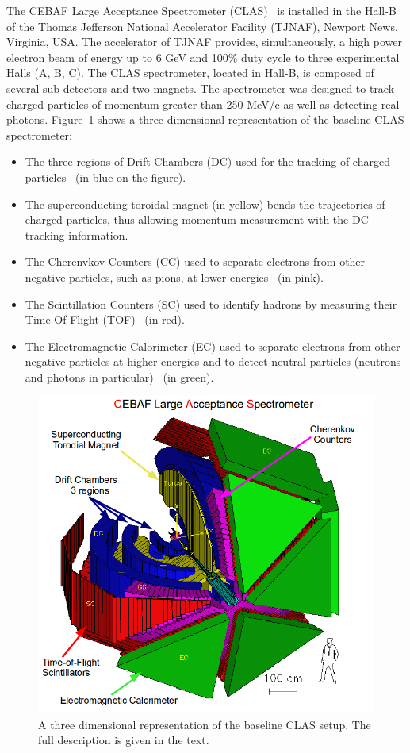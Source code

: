 \documentclass[twocolumn,showpacs,superscriptaddress,groupedaddress]{revtex4}
\begin{document}
The CEBAF Large Acceptance Spectrometer (CLAS)~\cite{CLASref} is installed in 
the Hall-B of the Thomas Jefferson National Accelerator Facility (TJNAF), 
Newport News, Virginia, USA. The accelerator of TJNAF provides, simultaneously, 
a high power electron beam of energy up to 6 GeV and 100$\%$ duty cycle to 
three experimental Halls (A, B, C). The CLAS spectrometer, located in Hall-B, 
is composed of several sub-detectors and two magnets. The spectrometer was 
designed to track charged particles of momentum greater than 250 MeV/c as well 
as detecting real photons. Figure~\ref{fig:CLAS} shows a three dimensional 
representation of the baseline CLAS spectrometer:
\begin{itemize}
 \item The three regions of Drift Chambers (DC) used for the tracking of charged 
    particles~\cite{DCref} (in blue on the figure).
 \item The superconducting toroidal magnet (in yellow) bends the trajectories 
    of charged particles, thus allowing momentum measurement with the DC tracking information.
 \item The Cherenvkov Counters (CC) used to separate electrons from other negative 
    particles, such as pions, at lower energies~\cite{CCref} (in pink).
 \item The Scintillation Counters (SC) used to identify hadrons by measuring their 
    Time-Of-Flight (TOF)~\cite{TOFref} (in red).
 \item The Electromagnetic Calorimeter (EC) used to separate electrons from other negative 
    particles at higher energies and to detect neutral particles (neutrons and 
    photons in particular)~\cite{ECref} (in green).
\end{itemize}

\begin{figure}[tbp]
\centering \includegraphics[scale=0.3]{fig/test_clas.png}
\caption{A three dimensional representation of the baseline CLAS setup. The
   full description is given in the text.} \label{fig:CLAS}
\end{figure}
\end{document}
